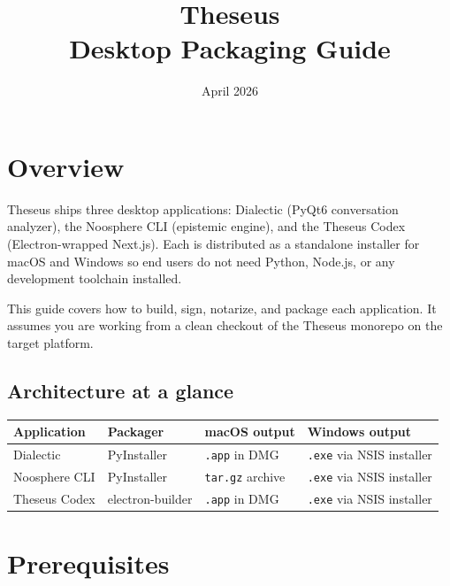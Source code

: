 \documentclass[11pt,letterpaper]{article}
\title{\textbf{Theseus}\\[4pt]\large Desktop Packaging Guide}
\date{April 2026}
\author{}
\newcommand{\file}[1]{\texttt{#1}}
\begin{document}
\maketitle
\thispagestyle{empty}

\tableofcontents
\newpage

\section{Overview}

Theseus ships three desktop applications: Dialectic (PyQt6 conversation analyzer), the Noosphere CLI (epistemic engine), and the Theseus Codex (Electron-wrapped Next.js). Each is distributed as a standalone installer for macOS and Windows so end users do not need Python, Node.js, or any development toolchain installed.

This guide covers how to build, sign, notarize, and package each application. It assumes you are working from a clean checkout of the Theseus monorepo on the target platform.

\subsection{Architecture at a glance}

\begin{table}[h]
\small
\begin{tabular}{p{3.2cm} p{3cm} p{4cm} p{4cm}}
\toprule
\textbf{Application} & \textbf{Packager} & \textbf{macOS output} & \textbf{Windows output} \\
\midrule
Dialectic           & PyInstaller    & \file{.app} in DMG          & \file{.exe} via NSIS installer \\
Noosphere CLI       & PyInstaller    & \file{tar.gz} archive       & \file{.exe} via NSIS installer \\
Theseus Codex      & electron-builder & \file{.app} in DMG        & \file{.exe} via NSIS installer \\
\bottomrule
\end{tabular}
\end{table}

\section{Prerequisites}
\end{document}
